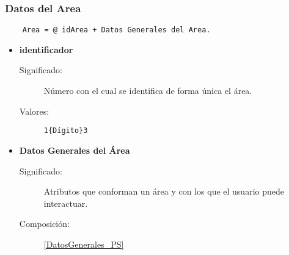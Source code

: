 \subsubsection{Datos del Area}
\begin{lstlisting}
	Area = @ idArea + Datos Generales del Area.
\end{lstlisting}
\begin{itemize}
	\item	\textbf{identificador}
		\begin{description}
			\item [Significado:] Número con el cual se identifica de forma única el área.
			\item [Valores:]{\begin{lstlisting}
1{Dígito}3\end{lstlisting}}
		\end{description}
	\item \textbf{Datos Generales del Área}
		\begin{description}
			\item [Significado:] Atributos que conforman un área y con los que el usuario puede interactuar.
			\item [Composición:] \ref{DatosGenerales_PS}
		\end{description}
\end{itemize}

